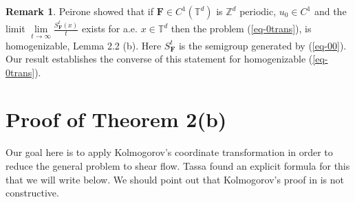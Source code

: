 \documentclass[10pt]{amsart}
\theoremstyle{definition}                                                                                  \newtheorem{remark}[theorem]{Remark}
\theoremstyle{theorem}
\begin{document}
\medskip 

\begin{remark}\label{rem-4}
Peirone showed that if ${\textbf{F}}\in C^1({\mathbb T}^d)$ is ${\mathbb Z}^d$ periodic, $u_0\in C^1$  and the limit $\lim\limits_{t\to \infty} \frac{S^t_{{\textbf{F}}}(x)}{t}$ exists 
for a.e. $x\in{\mathbb T}^d$  then the problem 
(\ref{eq-0trans}), is homogenizable, \cite{Peirone} Lemma 2.2 (b).
Here $S_{{\textbf{F}}}^t$ is the semigroup generated by (\ref{eq-00}).
Our result establishes the converse of this statement for homogenizable (\ref{eq-0trans}).
\end{remark}

\section{Proof of Theorem 2(b)}

Our goal here is to apply Kolmogorov's coordinate transformation in order to reduce the general problem to shear flow.
Tassa \cite{Tassa} found an explicit formula for this that we will write below. 
We should point out that Kolmogorov's proof in \cite{Kolm53} is not constructive.   
\end{document}
